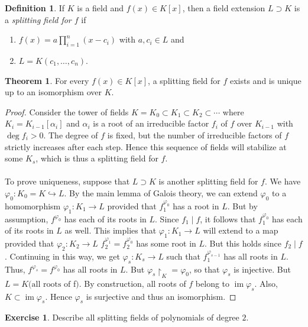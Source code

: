 \documentclass[10pt,letterpaper,cm]{nupset}
\theoremstyle{definition}
\newtheorem*{definition}{Definition}
\newtheorem{theorem}{Theorem}
\newtheorem{exercise}{Exercise}
\newcommand{\1}{\mathbf{1}}
\newcommand{\0}{\vec 0}
\DeclareMathOperator{\im}{im}
\begin{document}
\begin{definition}
If $K$ is a field and $f(x) \in K[x]$, then a field extension $L \supset K$ is a \textit{splitting field for $f$} if
\begin{enumerate}[label=(\alph*)]
\item $f(x) = a \prod_{i=1}^n (x-c_i)$ with $a, c_i \in L$ and
\item $L = K(c_1, \ldots, c_n)$.
\end{enumerate}
\end{definition}

\begin{theorem}
 For every $f(x) \in K[x]$, a splitting field for $f$ exists and is unique up to an isomorphism over $K$.
\end{theorem}
\begin{proof}
Consider the tower of fields $K= K_0 \subset K_1 \subset K_2 \subset \cdots$ where $K_i = K_{i-1}[\alpha_i]$ and $\alpha_i$ is a root of an irreducible factor $f_i$ of $f$ over $K_{i-1}$ with $\deg{f_i}>0$. The degree of $f$ is fixed, but the number of irreducible factors of $f$ strictly increases after each step. Hence this sequence of fields will stabilize at some $K_s$, which is thus a splitting field for $f$. 
\\ \\ To prove uniqueness, suppose that $L \supset K$ is another splitting field for $f$. We have $\varphi_0 : K_0 = K \hookrightarrow L$. By the main lemma of Galois theory, we can extend $\varphi_0 $ to a homomorphism $\varphi_1 : K_1 \to L$ provided that $f_1^{\varphi_0}$ has a root in $L$. But by assumption, $f^{\varphi_0}$ has each of its roots in $L$. Since $f_1 \mid f$, it follows that $f_1^{\varphi_0}$ has each of its roots in $L$ as well. This implies that $\varphi_1 : K_1 \to L$ will extend to a map provided that $\varphi_2 : K_2 \to L$ $f_2^{\varphi_1} = f_2^{\varphi_0}$ has some root in $L$.  But this holds since $f_2 \mid f$. Continuing in this way, we get $\varphi_s : K_s \to L$ such that $f_1^{\varphi_{s-1}}$ has all roots in $L$. Thus, $f^{\varphi_s} = f^{\varphi_0}$ has all roots in $L$. But $\varphi_s \restriction_K = \varphi_0$, so that $\varphi_s$ is injective. But $L = K(\text{all roots of } $f$)$. By construction, all roots of $f$ belong to $\im{\varphi_s}$. Also, $K \subset \im{\varphi_s}$. Hence $\varphi_s$ is surjective and thus an isomorphism.
\end{proof}

\begin{exercise}
Describe all splitting fields of polynomials of degree $2$.
\end{exercise}
\end{document}
